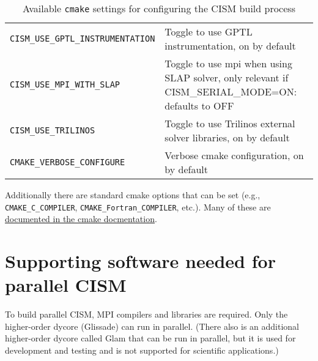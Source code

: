 \begin{table}
\begin{tabular}{ l | p{8cm} }
\texttt{CISM\_USE\_GPTL\_INSTRUMENTATION} & Toggle to use GPTL instrumentation, on by default \\

\texttt{CISM\_USE\_MPI\_WITH\_SLAP} & Toggle to use mpi when using SLAP solver, only relevant if CISM\_SERIAL\_MODE=ON: defaults to OFF \\

\texttt{CISM\_USE\_TRILINOS} & Toggle to use Trilinos external solver libraries, on by default \\

\texttt{CMAKE\_VERBOSE\_CONFIGURE} & Verbose cmake configuration, on by default \\







\hline
\end{tabular}
  \caption{Available \texttt{cmake} settings for configuring the CISM build process}
  \label{cmake-options}
\end{table}

Additionally there are standard cmake options that can be set (e.g., \texttt{CMAKE\_C\_COMPILER}, \texttt{CMAKE\_Fortran\_COMPILER}, etc.).  Many of these are \href{http://www.cmake.org/Wiki/CMake_Useful_Variables}{documented in the cmake docmentation}.




\section{Supporting software needed for parallel CISM}
To build parallel CISM, MPI compilers and libraries are required.  
Only the higher-order dycore (Glissade) can run in parallel.  (There also is an
additional higher-order dycore called Glam that can be run in parallel, but it is used
for development and testing and is not supported for scientific applications.)


